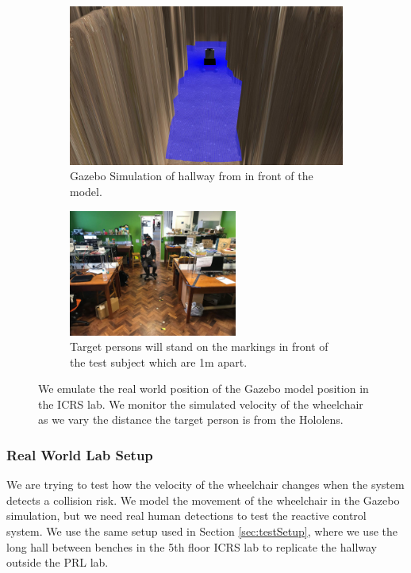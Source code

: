 \begin{figure}[ht!]
    \begin{subfigure}[b]{.48\textwidth}
        \centering
        \includegraphics[width=1.0\linewidth]{img/chapter6_test/gazeboFront.jpg}
        \caption{Gazebo Simulation of hallway from in front of the model.}
    \end{subfigure}%
    \hspace{\fill} 
    \begin{subfigure}[b]{.48\textwidth}
        \centering
        \includegraphics[width=1.0\linewidth,height=41.5mm]{img/chapter6_test/realFront.jpg}
        \caption{Target persons will stand on the markings in front of the test subject which are 1m apart.}
    \end{subfigure}
    \vspace{-1\baselineskip}
    \begin{center}
        \caption{We emulate the real world position of the Gazebo model position in the ICRS lab. We monitor the simulated velocity of the wheelchair as we vary the distance the target person is from the Hololens.}
        \label{fig:greenredrender}
    \end{center}
    \vspace{-2\baselineskip}
\end{figure}

\subsubsection{Real World Lab Setup}
We are trying to test how the velocity of the wheelchair changes when the system detects a collision risk. We model the movement of the wheelchair in the Gazebo simulation, but we need real human detections to test the reactive control system. We use the same setup used in Section \ref{sec:testSetup}, where we use the long hall between benches in the 5th floor ICRS lab to replicate the hallway outside the PRL lab.

